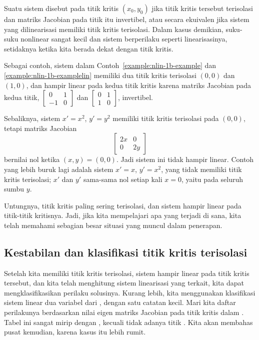 Suatu sistem disebut \emph{} pada titik kritis
$(x_0,y_0)$ jika titik kritis tersebut terisolasi dan matriks Jacobian pada titik itu
invertibel, atau secara ekuivalen jika sistem yang dilinearisasi memiliki titik kritis
terisolasi. Dalam kasus demikian, suku-suku nonlinear sangat kecil
dan sistem berperilaku seperti linearisasinya, setidaknya ketika kita berada dekat
dengan titik kritis.

Sebagai contoh, sistem dalam
Contoh~\ref{example:nlin-1b-example} dan \ref{example:nlin-1b-examplelin}
memiliki dua titik kritis terisolasi $(0,0)$ dan $(1,0)$, dan
hampir linear pada kedua titik kritis karena
matriks Jacobian pada kedua titik,
$\left[ \begin{smallmatrix} 0 & 1 \\ -1 & 0 \end{smallmatrix} \right]$ dan
$\left[ \begin{smallmatrix} 0 & 1 \\ 1 & 0 \end{smallmatrix} \right]$,
invertibel.

Sebaliknya, sistem $x' = x^2$, $y' = y^2$ memiliki titik kritis terisolasi
pada $(0,0)$, tetapi matriks Jacobian
\begin{equation*}
\begin{bmatrix} 2x & 0 \\ 0 & 2y \end{bmatrix}
\end{equation*}
bernilai nol ketika $(x,y) = (0,0)$. Jadi sistem ini tidak hampir
linear.
Contoh yang lebih buruk lagi adalah sistem $x' = x$, $y' = x^2$, yang tidak memiliki
titik kritis terisolasi; $x'$ dan $y'$ sama-sama nol
setiap kali $x=0$, yaitu pada seluruh sumbu $y$.

Untungnya, titik kritis paling sering
terisolasi, dan sistem hampir linear pada titik-titik kritisnya.
Jadi, jika kita mempelajari apa yang terjadi di sana, kita telah memahami sebagian besar
situasi yang muncul dalam penerapan.



\subsection{Kestabilan dan klasifikasi titik kritis terisolasi}

Setelah kita memiliki titik kritis terisolasi, sistem hampir linear pada
titik kritis tersebut, dan kita telah menghitung sistem linearisasi
yang terkait, kita dapat mengklasifikasikan perilaku
solusinya. Kurang lebih, kita menggunakan klasifikasi sistem linear
dua variabel dari , dengan satu catatan
kecil.
Mari kita daftar perilakunya berdasarkan nilai eigen
matriks Jacobian pada titik kritis dalam .
Tabel ini sangat mirip dengan ,
kecuali tidak adanya titik .
Kita akan membahas pusat kemudian, karena kasus itu lebih rumit.

